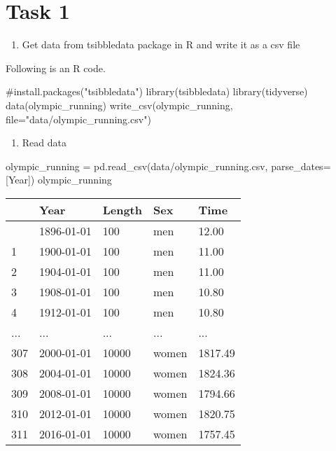 \documentclass[
  letterpaper,
  DIV=11,
  numbers=noendperiod]{scrreprt}
\newenvironment{Shaded}{\begin{snugshade}}{\end{snugshade}}
\newcommand{\AttributeTok}[1]{\textcolor[rgb]{0.40,0.45,0.13}{#1}}
\newcommand{\CommentTok}[1]{\textcolor[rgb]{0.37,0.37,0.37}{#1}}
\newcommand{\FunctionTok}[1]{\textcolor[rgb]{0.28,0.35,0.67}{#1}}
\newcommand{\NormalTok}[1]{\textcolor[rgb]{0.00,0.23,0.31}{#1}}
\newcommand{\OperatorTok}[1]{\textcolor[rgb]{0.37,0.37,0.37}{#1}}
\newcommand{\StringTok}[1]{\textcolor[rgb]{0.13,0.47,0.30}{#1}}
\providecommand{\tightlist}{%
  \setlength{\itemsep}{0pt}\setlength{\parskip}{0pt}}\usepackage{longtable,booktabs,array}
\begin{document}
\hypertarget{task-1}{%
\section{Task 1}\label{task-1}}

\begin{enumerate}
\def\labelenumi{\arabic{enumi}.}
\tightlist
\item
  Get data from tsibbledata package in R and write it as a csv file
\end{enumerate}

Following is an R code.

\begin{Shaded}
\begin{Highlighting}[]
\CommentTok{\#install.packages("tsibbledata")}
\FunctionTok{library}\NormalTok{(tsibbledata)}
\FunctionTok{library}\NormalTok{(tidyverse)}
\FunctionTok{data}\NormalTok{(olympic\_running)}
\FunctionTok{write\_csv}\NormalTok{(olympic\_running, }\AttributeTok{file=}\StringTok{"data/olympic\_running.csv"}\NormalTok{)}
\end{Highlighting}
\end{Shaded}

\begin{enumerate}
\def\labelenumi{\arabic{enumi}.}
\setcounter{enumi}{1}
\tightlist
\item
  Read data
\end{enumerate}

\begin{Shaded}
\begin{Highlighting}[]
\NormalTok{olympic\_running }\OperatorTok{=}\NormalTok{ pd.read\_csv(}\StringTok{\textquotesingle{}data/olympic\_running.csv\textquotesingle{}}\NormalTok{, parse\_dates}\OperatorTok{=}\NormalTok{[}\StringTok{\textquotesingle{}Year\textquotesingle{}}\NormalTok{])}
\NormalTok{olympic\_running}
\end{Highlighting}
\end{Shaded}

\begin{longtable}[]{@{}lllll@{}}
\toprule\noalign{}
& Year & Length & Sex & Time \\
\midrule\noalign{}
\endhead
\bottomrule\noalign{}
\endlastfoot
0 & 1896-01-01 & 100 & men & 12.00 \\
1 & 1900-01-01 & 100 & men & 11.00 \\
2 & 1904-01-01 & 100 & men & 11.00 \\
3 & 1908-01-01 & 100 & men & 10.80 \\
4 & 1912-01-01 & 100 & men & 10.80 \\
... & ... & ... & ... & ... \\
307 & 2000-01-01 & 10000 & women & 1817.49 \\
308 & 2004-01-01 & 10000 & women & 1824.36 \\
309 & 2008-01-01 & 10000 & women & 1794.66 \\
310 & 2012-01-01 & 10000 & women & 1820.75 \\
311 & 2016-01-01 & 10000 & women & 1757.45 \\
\end{longtable}
\end{document}
